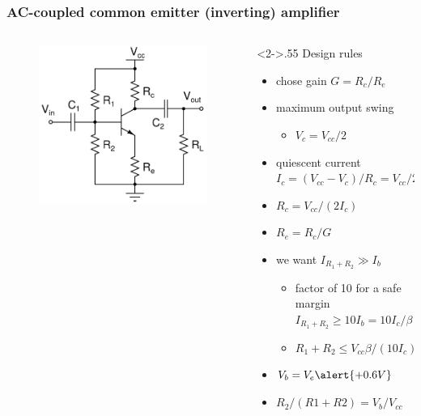 \documentclass[beamer]{standalone}
\begin{document}
\frame
{ \frametitle{AC-coupled common emitter (inverting) amplifier}
\begin{columns}[c]
	\begin{column}{.45\textwidth}
		\begin{figure}
			\includegraphics[height=0.50\textheight]{./schematics/npn_ac_common_emitter_amplifier}
		\end{figure}
	\end{column}
	\begin{column}<2->{.55\textwidth}
		Design rules
		\begin{itemize}
			\item chose gain $G=R_c/R_e$
			\item maximum output swing 
				\begin{itemize}
					\item $V_c=V_{cc} /2 $
				\end{itemize}
			\item quiescent current
				$I_c=(V_{cc}-V_c)/R_c= V_{cc}/2R_c$
			\item $R_c=V_{cc}/(2 I_c)$
			\item $R_e=R_c/G$ 
			\item we want $I_{R_1+R_2} \gg I_b$
				\begin{itemize}
					\item factor of 10 for a safe margin
						$I_{R_1+R_2} \ge 10 I_b = 10 I_c / \beta$
					\item
						$R_1+R_2 \le V_{cc} \beta /(10 I_c)$
				\end{itemize}
			\item $V_b=V_e \alert{+0.6 V}$
			\item 	$R_2 /(R1+R2) = V_b/V_{cc}$
		\end{itemize}
	\end{column}
\end{columns}
	
	}
\end{document}
